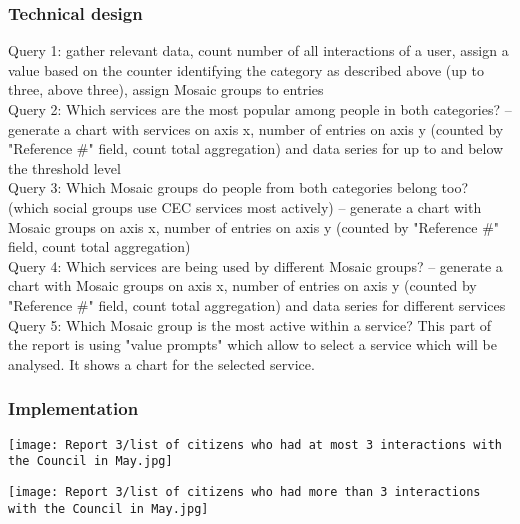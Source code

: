			\subsubsection{Technical design}
			
Query 1: gather relevant data, count number of all interactions of a user, assign a value based on the counter identifying the category as described above (up to three, above three), assign Mosaic groups to entries\\
Query 2: Which services are the most popular among people in both categories? – generate a chart with services on axis x, number of entries on axis y (counted by "Reference \#" field, count total aggregation) and data series for up to and below the threshold level\\
Query 3: Which Mosaic groups do people from both categories belong too? (which social groups use CEC services most actively) – generate a chart with Mosaic groups on axis x, number of entries on axis y (counted by "Reference \#" field, count total aggregation)\\
Query 4: Which services are being used by different Mosaic groups? – generate a chart with Mosaic groups on axis x, number of entries on axis y (counted by "Reference \#" field, count total aggregation) and data series for different services\\
Query 5: Which Mosaic group is the most active within a service? This part of the report is using "value prompts" which allow to select a service which will be analysed. It shows a chart for the selected service.
			
			\subsubsection{Implementation}
			
			
\begin{center}
  \texttt{[image: Report 3/list of citizens who had at most 3 interactions with the Council in May.jpg]}
\end{center}
			

\begin{center}
  \texttt{[image: Report 3/list of citizens who had more than 3 interactions with the Council in May.jpg]}
\end{center}



